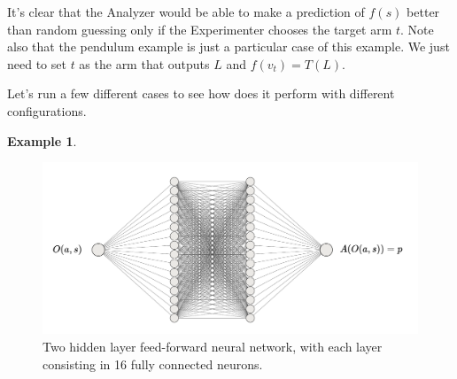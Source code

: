 \documentclass[11pt,a4paper,twoside]{report}
\newcommand{\+}{\textnormal{+} }
\theoremstyle{definition}
\newtheorem{myex}[mythm]{Example}
\numberwithin{equation}{chapter}
\begin{document}
  \par It's clear that the Analyzer would be able to make a prediction of $f(s)$
  better than random guessing only if the Experimenter chooses the target arm
  $t$. Note also that the pendulum example is just a particular case of this
  example. We just need to set $t$ as the arm that outputs $L$ and
  $f(v_t)=T(L)$.

  Let's run a few different cases to see how does it perform with different
  configurations.

  \begin{myex}\label{MAB1ex}

    \begin{figure}
      \centering
      \includegraphics[scale=0.5]{figures/Analyzer1.pdf}
      \caption{Two hidden layer feed-forward neural network, with each layer
      consisting in 16 fully connected neurons.}
      \label{Analyzer1}
    \end{figure}



\end{myex}
\end{document}
